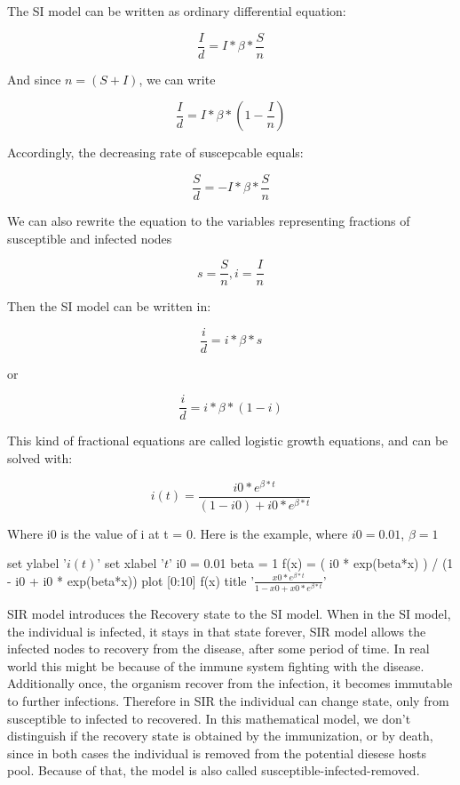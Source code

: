 \documentclass[nostrict]{szablonPG}
\begin{document}
The SI model can be written as ordinary differential equation:

\[\frac{I}{d} = I * \beta * \frac{S}{n}\]

And since $n = (S + I)$, we can write 

\[\frac{I}{d} = I * \beta * (1 - \frac{I}{n})\]

Accordingly, the decreasing rate of suscepcable equals:

\[\frac{S}{d} = - I * \beta * \frac{S}{n}\]

We can also rewrite the equation to the variables representing fractions of susceptible and infected nodes

\[s = \frac{S}{n}, i = \frac{I}{n}\]

Then the SI model can be written in:

\[\frac{i}{d} = i*\beta*s\]

or 

\[\frac{i}{d} = i * \beta * (1-i)\]

This kind of fractional equations are called logistic growth equations, and can be solved with:

\[i(t) =\frac{ i0 * e^{\beta*t} }{(1 - i0) + i0 * e^{\beta*t}}\]

Where i0 is the value of i at t = 0. Here is the example, where $i0 = 0.01$, $\beta = 1$

\begin{gnuplot}[scale=0.8]
	set ylabel '$i(t)$'
	set xlabel '$t$'
	i0 = 0.01
	beta = 1
	f(x) = ( i0 * exp(beta*x) ) / (1 - i0 + i0 * exp(beta*x))
	plot [0:10] f(x) title '$\frac{x0 * e^{\beta*t}}{1 - x0 + x0 * e^{\beta*t}}$'
\end{gnuplot}

SIR model introduces the Recovery state to the SI model. When in the SI model, the individual is infected, it stays in that state forever, SIR model allows the infected nodes to recovery from the disease, after some period of time. In real world this might be because of the immune system fighting with the disease. Additionally once, the organism recover from the infection, it becomes immutable to further infections. Therefore in SIR the individual can change state, only from susceptible to infected to recovered. In this mathematical model, we don't distinguish if the recovery state is obtained by the immunization, or  by death, since in both cases the individual is removed from the potential diesese hosts pool. Because of that, the model is also called susceptible-infected-removed.
\end{document}
